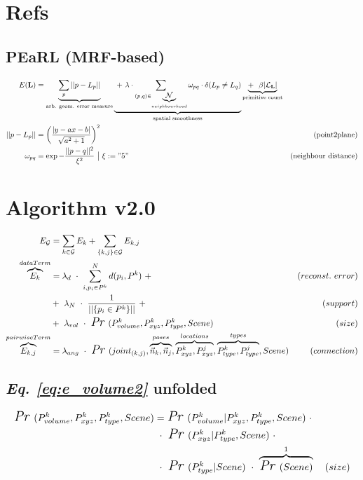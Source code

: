\documentclass[11pt,a3paper]{article}
\newcommand{\pr}[1]{\textit{\Large Pr~}(#1)}
\let\oldeqref\eqref
\renewcommand{\eqref}[1]{ {\it Eq. \oldeqref{#1}} }
\begin{document}
\section{Refs}
\subsection{PEaRL (MRF-based)}
\begin{align}
E({\bf L}) &= \underbrace{\sum_p ||p-L_p|| }_{\text{arb. geom. error measure}}
\underbrace{~+~ \lambda \cdot \sum_{(p,q)\in \underbrace{\mathcal{N}}_{neighbourhood}} \omega_{pq} \cdot \delta(L_p \neq L_q)}_{\text{spatial smoothness}}
\underbrace{ + ~~ \beta |\mathcal{L}_{{\bf L}} |}_{\text{primitive count}} \\
%
||p-L_p|| &= \left( \frac{|y-ax-b|}{\sqrt{a^2+1}} \right)^2 &(\text{point2plane}) \\
%
\omega_{pq} &= \exp - \frac{||p-q||^2}{\xi^2} ~\big|~ \xi:= "5" & (\text{neighbour distance})
\end{align}

\section{Algorithm v2.0}
\begin{align}
	E_{\mathcal{G}} &= \sum_{k \in \mathcal{G}} {E_k} 
				 	 + \sum_{\{k,j\} \in \mathcal{G}}{E_{k,j}}
				 	 \label{eq:e_graph2}
	\\
%
	\overbrace{E_{k}}^{dataTerm} &= 
		\lambda_{d} ~\cdot~ \sum_{i, p_i \in P^k }^N d(p_i,P^k) ~+ &(reconst.\  error)\label{eq:e_dist2} \\
		&+~ \lambda_N ~\cdot~ \frac{1}{||\{p_i \in P^k \}||} ~+ &(support) \label{eq:e_size2} \\
		&+~ \lambda_{vol} ~\cdot~ \pr{P^k_{volume}, P^k_{xyz}, P^k_{type}, Scene } &(size)			\label{eq:e_volume2}
	\\
%
	\overbrace{E_{k,j}}^{pairwiseTerm} &= 
		\lambda_{ang} ~\cdot~ 
		\pr{joint_{(k,j)},
			\overbrace{\vec{n}_k,\vec{n}_j}^{poses},
		    \overbrace{P^k_{xyz},P^j_{xyz}}^{locations},
			\overbrace{P^k_{type},P^j_{type}}^{types},Scene}
		&(connection) 
		\label{eq:e_angle2} 
\end{align}
\subsection*{\eqref{eq:e_volume2} unfolded}
\begin{align}
	\pr{P^k_{volume}, P^k_{xyz}, P^k_{type}, Scene } &=
		\pr{P^k_{volume} | P^k_{xyz}, P^k_{type}, Scene }  ~\cdot~\notag\\
&~\cdot~\pr{P^k_{xyz} | P^k_{type}, Scene }  ~\cdot~\notag\\
&~\cdot~\pr{P^k_{type} | Scene }  ~\cdot~\overbrace{\pr{Scene}}^1 &(size)
\end{align}
\end{document}

